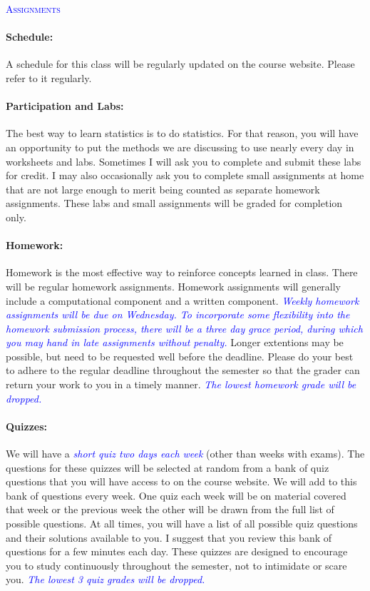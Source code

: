\documentclass[12pt,a4paper]{article}
\begin{document}
\textcolor{blue}{\textsc{Assignments}}

\paragraph{Schedule:} A schedule for this class will be regularly updated on the course website. Please refer to it regularly. 
 
\paragraph{Participation and Labs:} The best way to learn statistics is to do statistics. For that reason, you will have an opportunity to put the methods we are discussing to use nearly every day in worksheets and labs. Sometimes I will ask you to complete and submit these labs for credit. I may also occasionally ask you to complete small assignments at home that are not large enough to merit being counted as separate homework assignments. These labs and small assignments will be graded for completion only.

\paragraph{Homework:} Homework is the most effective way to reinforce concepts learned in class. There will be regular homework assignments. Homework assignments will generally include a computational component and a written component. \textcolor{blue}{\emph{Weekly homework assignments will be due on Wednesday. To incorporate some flexibility into the homework submission process, there will be a three day grace period, during which you may hand in late assignments without penalty.}} Longer extentions may be possible, but need to be requested well before the deadline. Please do your best to adhere to the regular deadline throughout the semester so that the grader can return your work to you in a timely manner. \textcolor{blue}{\emph{The lowest homework grade will be dropped.}} 

\paragraph{Quizzes:} We will have a \textcolor{blue}{\emph{short quiz two days each week}} (other than weeks with exams). The questions for these quizzes will be selected at random from a bank of quiz questions that you will have access to on the course website. We will add to this bank of questions every week. One quiz each week will be on material covered that week or the previous week the other will be drawn from the full list of possible questions. At all times, you will have a list of all possible quiz questions and their solutions available to you. I suggest that you review this bank of questions for a few minutes each day. These quizzes are designed to encourage you to study continuously throughout the semester, not to intimidate or scare you. \textcolor{blue}{\emph{The lowest 3 quiz grades will be dropped.}}
\end{document}
